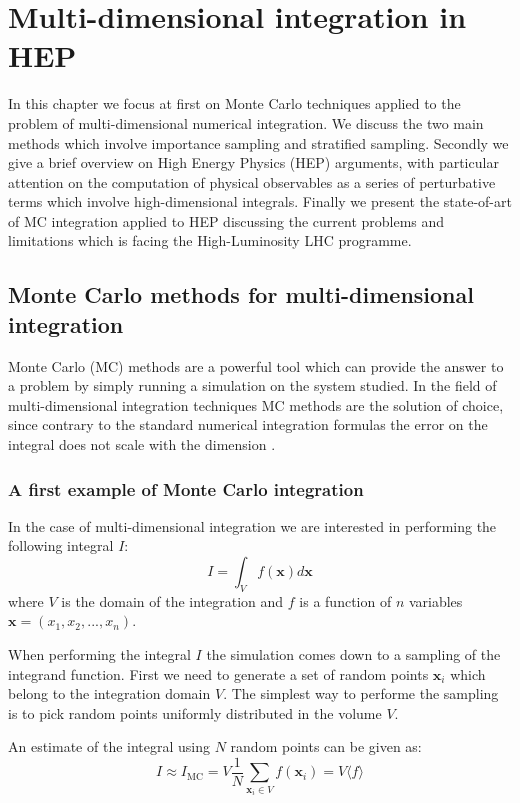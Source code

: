 \documentclass[../main/main.tex]{subfiles}
\begin{document}
\chapter[Multi-dimensional integration in HEP]{Multi-dimensional integration in HEP}
In this chapter we focus at first on Monte Carlo techniques applied to the problem of multi-dimensional numerical integration.
We discuss the two main methods which involve importance sampling and stratified sampling.
Secondly we give a brief overview on High Energy Physics (HEP) arguments, with particular attention 
on the computation of physical observables as a series of perturbative terms which involve high-dimensional integrals.
Finally we present the state-of-art of  MC integration applied to HEP discussing the current problems and limitations which
is facing the High-Luminosity LHC programme.

\section[MC methos for multi-dimensional integration]{Monte Carlo methods for multi-dimensional integration}
Monte Carlo (MC) methods are a powerful tool which can provide the answer to a 
problem by simply running a simulation on the system studied.
In the field of multi-dimensional integration techniques MC methods are the solution of choice, since contrary 
to the standard numerical integration formulas  the error on the integral does not scale with the dimension \cite{Press:1992zz}. 


\subsection{A first example of Monte Carlo integration}
In the case of multi-dimensional integration we are interested in performing the following
integral $I$:
\begin{equation}
	I = \int_{V}   f(\textbf{x}) d \textbf{x} 
\end{equation}
where $V$ is the domain of the integration and $f$ is a function of $n$ variables 
$\textbf{x} = (x_1,x_2, ..., x_n)$.

When performing the integral $I$ the simulation comes down to a sampling of the integrand function.
First we need to generate a set of random points $\textbf{x}_i$ which belong to the integration domain $V$.
The simplest way to performe the sampling is to pick random points uniformly distributed 
in the volume $V$.

An estimate of the integral using $N$ random points can be given as:
\begin{equation}
	I \approx I_{\text{MC}} = V \frac{1}{N} \sum_{\textbf{x}_i \in V} f(\textbf{x}_i) = V \langle f \rangle
\end{equation}
\end{document}
